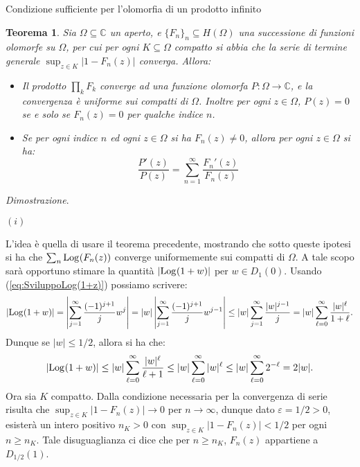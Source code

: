 \documentclass[11pt]{book}
\makeatletter
\theoremstyle{Definizione}
\theoremstyle{TeoremaProposizioneLemmaCorollarioCongettura}
\newtheorem{myteo}{Teorema}[section]
\theoremstyle{OsservazioneNotaEsempio}
\renewenvironment{proof}[1][\proofname]{\par
  \normalfont \topsep6\p@\@plus6\p@\relax
  \trivlist
  \item[\hskip\labelsep
        \itshape
    #1\@addpunct{.}]\ignorespaces
}{%
  \endtrivlist\@endpefalse
}
\renewenvironment{proof}{\textsl{Dimostrazione}.}{}
\newcommand{\C}{\mathbb{C}}
\newcommand{\Disc}[3][]{D^{#1}_{{#2}}({#3})}
\newcommand{\Log}[1][]{\textup{Log}_{#1}}
\makeatother
\begin{document}
\begin{boxteo}{Condizione sufficiente per l'olomorfia di un prodotto infinito}
\begin{myteo}\label{teo:CondizioneSufficienteOlomorfiaProdottoInfinito}
Sia $\Omega\subseteq \C$ un aperto, e $\{F_n\}_n \subseteq H(\Omega)$ una successione di funzioni olomorfe su $\Omega$, per cui per ogni $K\subseteq \Omega$ compatto si abbia che la serie di termine generale $\sup_{z\in K} |1-F_n(z)|$ converga. Allora:
\begin{itemize}
\item[$(i)$] Il prodotto $\prod_k F_k$ converge ad una funzione olomorfa $P:\Omega\longrightarrow \C$, e la convergenza è uniforme sui compatti di $\Omega$. Inoltre per ogni $z\in \Omega$, $P(z) = 0$ se e solo se $F_n(z) = 0$ per qualche indice $n$.
\item[$(ii)$] Se per ogni indice $n$ ed ogni $z\in \Omega$ si ha $F_n(z) \neq 0$, allora per ogni $z\in \Omega$ si ha:
$$
\frac{P'(z)}{P(z)} = \sum_{n = 1}^\infty \frac{F_n'(z)}{F_n(z)}
$$
\end{itemize}
\end{myteo}
\tcblower
\begin{proof}
\hfill
\begin{flushleft}
$(i)$
\end{flushleft}
L'idea è quella di usare il teorema precedente, mostrando che sotto queste ipotesi si ha che $\sum_n \Log(F_n(z))$ converge uniformemente sui compatti di $\Omega$. A tale scopo sarà opportuno stimare la quantità $|\Log(1+w)|$ per $w\in \Disc{1}{0}$. Usando (\ref{eq:SviluppoLog(1+z)}) possiamo scrivere:
$$
|\Log(1+w)| = \left|\sum_{j = 1}^\infty \frac{(-1)^{j+1}}{j}w^{j}\right| = |w|\left|\sum_{j  = 1}^\infty \frac{(-1)^{j+1}}{j}w^{j-1}\right| \leq |w|\sum_{j = 1}^\infty \frac{|w|^{j-1}}{j} = |w|\sum_{\ell = 0}^\infty \frac{|w|^\ell}{1+\ell}.
$$
Dunque se $|w| \leq 1/2$, allora si ha che:
\begin{equation}\label{eq:teo:CondizioneSufficienteOlomorfiaProdottoInfinitoStimaLog(1+w)}
|\Log(1+w)| \leq |w|\sum_{\ell = 0}^\infty \frac{|w|^\ell}{\ell+1}\leq |w|\sum_{\ell = 0}^\infty |w|^\ell \leq |w|\sum_{\ell = 0}^\infty 2^{-\ell} = 2|w|.
\end{equation}
Ora sia $K$ compatto. Dalla condizione necessaria per la convergenza di serie risulta che $\sup_{z\in K} |1-F_n(z)| \to 0$ per $n\to \infty$, dunque dato $\varepsilon = 1/2> 0$, esisterà un intero positivo $n_K > 0$ con $\sup_{z\in K} |1-F_n(z)| < 1/2$ per ogni $n\geq n_K$. Tale disuguaglianza ci dice che per $n\geq n_K$, $F_n(z)$ appartiene a $\Disc{1/2}{1}$.\\

\end{proof}
\end{boxteo}
\end{document}
